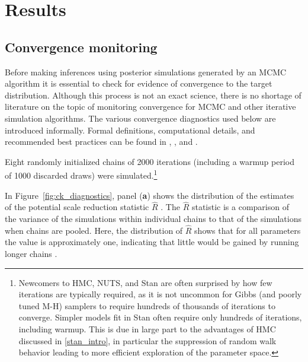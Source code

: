 \section{Results}
\label{results_convergence_checking}


\subsection{Convergence monitoring}
\label{subsection_convergence}

Before making inferences using posterior simulations generated by an MCMC algorithm 
it is essential to check for evidence of convergence to the target distribution. Although this 
process is not an exact science, there is no shortage of literature on the topic of monitoring 
convergence for MCMC and other iterative simulation algorithms. The various convergence 
diagnostics used below are introduced informally. Formal definitions, computational details, 
and recommended best practices can be found in , 
, and .

Eight randomly initialized chains of 2000 iterations (including a warmup period of 1000 
discarded draws) were simulated.\footnote{Newcomers to HMC, NUTS, and Stan are 
often surprised by how few iterations are typically required, as it is not uncommon for 
Gibbs (and poorly tuned M-H) samplers to require hundreds of thousands of iterations 
to converge. Simpler models fit in Stan often require only hundreds of iterations, including 
warmup. This is due in large part to the advantages of HMC discussed in \ref{stan_intro}, in
particular the suppression of random walk behavior leading to more efficient exploration
of the parameter space.} 

In Figure~\ref{fig:ck_diagnostics}, panel ({\bf a}) shows the distribution of the estimates of 
the potential scale reduction statistic $\hat{R}$  . The $\hat{R}$ 
statistic is a comparison of the variance of the simulations within individual chains to that of 
the simulations when chains are pooled. Here, the distribution of $\hat{R}$ shows that for 
all parameters the value is approximately one, indicating that little would be gained by running 
longer chains . 

